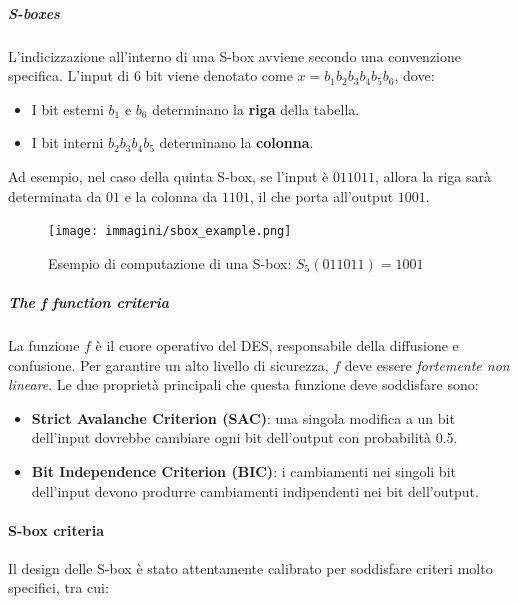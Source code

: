 \documentclass{report}
\begin{document}
\subparagraph{S-boxes}

L’indicizzazione all’interno di una S-box avviene secondo una convenzione specifica. L’input di 6 bit viene denotato come $x = b_1 b_2 b_3 b_4 b_5 b_6$, dove:
\begin{itemize}
    \item I bit esterni $b_1$ e $b_6$ determinano la \textbf{riga} della tabella.
    \item I bit interni $b_2 b_3 b_4 b_5$ determinano la \textbf{colonna}.
\end{itemize}
Ad esempio, nel caso della quinta S-box, se l’input è $011011$, allora la riga sarà determinata da $01$ e la colonna da $1101$, il che porta all’output $1001$.

\begin{figure}[h]
\centering
\texttt{[image: immagini/sbox\_example.png]}
\caption{Esempio di computazione di una S-box: $S_5(011011) = 1001$}
\end{figure}

\subparagraph{The f function criteria}

La funzione $f$ è il cuore operativo del DES, responsabile della diffusione e confusione. Per garantire un alto livello di sicurezza, $f$ deve essere \textit{fortemente non lineare}. Le due proprietà principali che questa funzione deve soddisfare sono:

\begin{itemize}
    \item \textbf{Strict Avalanche Criterion (SAC)}: una singola modifica a un bit dell’input dovrebbe cambiare ogni bit dell’output con probabilità 0.5.
    \item \textbf{Bit Independence Criterion (BIC)}: i cambiamenti nei singoli bit dell’input devono produrre cambiamenti indipendenti nei bit dell’output.
\end{itemize}

\paragraph{S-box criteria}

Il design delle S-box è stato attentamente calibrato per soddisfare criteri molto specifici, tra cui:
\end{document}
